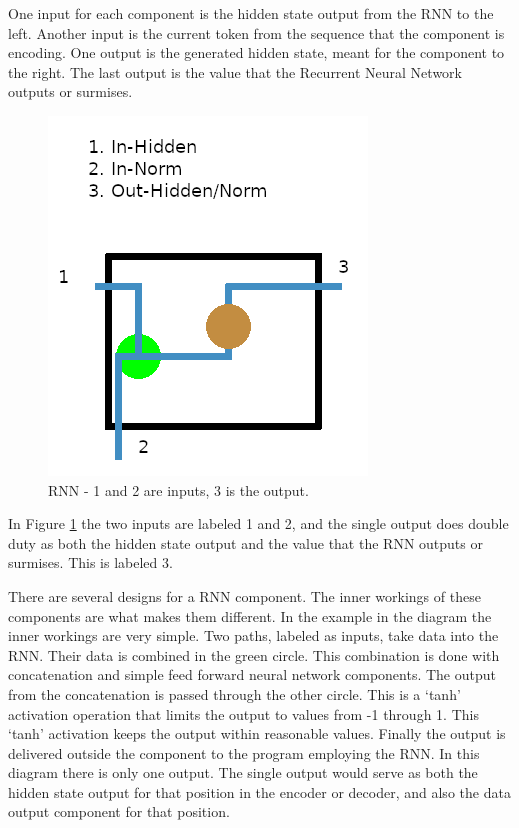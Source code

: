 One input for each component is the hidden state output from the RNN to the left. Another input is the current token from the sequence that the component is encoding. One output is the generated hidden state, meant for the component to the right. The last output is the value that the Recurrent Neural Network outputs or surmises. 

\begin{figure}[H]
	\begin{center}
	
	\includegraphics[scale=0.5]{diagram-rnn01}
		
	\end{center}
	\caption[Recurrent Neural Network]{RNN - 1 and 2 are inputs, 3 is the output.}
	\label{rnn-01}

\end{figure}

In Figure \ref{rnn-01} the two inputs are labeled 1 and 2, and the single output does double duty as both the hidden state output and the value that the RNN outputs or surmises. This is labeled 3.

There are several designs for a RNN component. The inner workings of these components are what makes them different. In the example in the diagram the inner workings are very simple. Two paths, labeled as inputs, take data into the RNN. Their data is combined in the green circle. This combination is done with concatenation and simple feed forward neural network components. The output from the concatenation is passed through the other circle. This is a `tanh' activation operation that limits the output to values from -1 through 1. This `tanh' activation keeps the output within reasonable values. Finally the output is delivered outside the component to the program employing the RNN. In this diagram there is only one output. The single output would serve as both the hidden state output for that position in the encoder or decoder, and also the data output component for that position.



